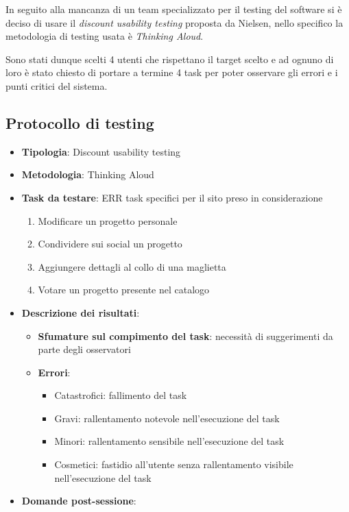 \documentclass[12pt,italian,]{report}
\providecommand{\tightlist}{%
  \setlength{\itemsep}{0pt}\setlength{\parskip}{0pt}}
\begin{document}
In seguito alla mancanza di un team specializzato per il testing del
software si è deciso di usare il \emph{discount usability testing}
proposta da Nielsen, nello specifico la metodologia di testing usata è
\emph{Thinking Aloud}.

Sono stati dunque scelti 4 utenti che rispettano il target scelto e ad
ognuno di loro è stato chiesto di portare a termine 4 task per poter
osservare gli errori e i punti critici del sistema.

\hypertarget{protocollo-di-testing}{%
\subsection{Protocollo di testing}\label{protocollo-di-testing}}

\begin{itemize}
\item
  \textbf{Tipologia}: Discount usability testing
\item
  \textbf{Metodologia}: Thinking Aloud
\item
  \textbf{Task da testare}: ERR task specifici per il sito preso in
  considerazione

  \begin{enumerate}
  \def\labelenumi{\arabic{enumi}.}
  \tightlist
  \item
    Modificare un progetto personale
  \item
    Condividere sui social un progetto
  \item
    Aggiungere dettagli al collo di una maglietta
  \item
    Votare un progetto presente nel catalogo
  \end{enumerate}
\item
  \textbf{Descrizione dei risultati}:

  \begin{itemize}
  \item
    \textbf{Sfumature sul compimento del task}: necessità di
    suggerimenti da parte degli osservatori
  \item
    \textbf{Errori}:

    \begin{itemize}
    \tightlist
    \item
      Catastrofici: fallimento del task
    \item
      Gravi: rallentamento notevole nell'esecuzione del task
    \item
      Minori: rallentamento sensibile nell'esecuzione del task
    \item
      Cosmetici: fastidio all'utente senza rallentamento visibile
      nell'esecuzione del task
    \end{itemize}
  \end{itemize}
\item
  \textbf{Domande post-sessione}:


\end{itemize}
\end{document}
